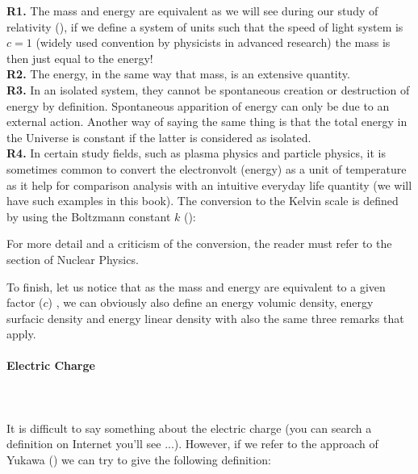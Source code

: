 	\begin{tcolorbox}[title=Remarks,colframe=black,arc=10pt]
	\textbf{R1.} The mass and energy are equivalent as we will see during our study of relativity (), if we define a system of units such that the speed of light system is $c=1$ (widely used convention by physicists in advanced research) the mass is then just equal to the energy!\\
	
	\textbf{R2.} The energy, in the same way that mass, is an extensive quantity.\\
	
	\textbf{R3.} In an isolated system, they cannot be spontaneous creation or destruction of energy by definition. Spontaneous apparition of energy can only be due to an external action. Another way of saying the same thing is that the total energy in the Universe is constant if the latter is considered as isolated.\\
	
	\textbf{R4.} In certain study fields, such as plasma physics and particle physics, it is sometimes common to convert the electronvolt (energy) as a unit of temperature as it help for comparison analysis with an intuitive everyday life quantity (we will have such examples in this book). The conversion to the Kelvin scale is defined by using the Boltzmann constant $k$ ():
	
	For more detail and a criticism of the conversion, the reader must refer to the section of Nuclear Physics.
	\end{tcolorbox}	
	
	To finish, let us notice that as the mass and energy are equivalent to a given factor ($c$) , we can obviously also define an energy volumic density, energy surfacic density and energy linear density with also the same three remarks that apply.
	
	\paragraph{Electric Charge}\mbox{}\\\\
	It is difficult to say something about the electric charge (you can search a definition on Internet you'll see ...). However, if we refer to the approach of Yukawa () we can try to give the following definition:
	

